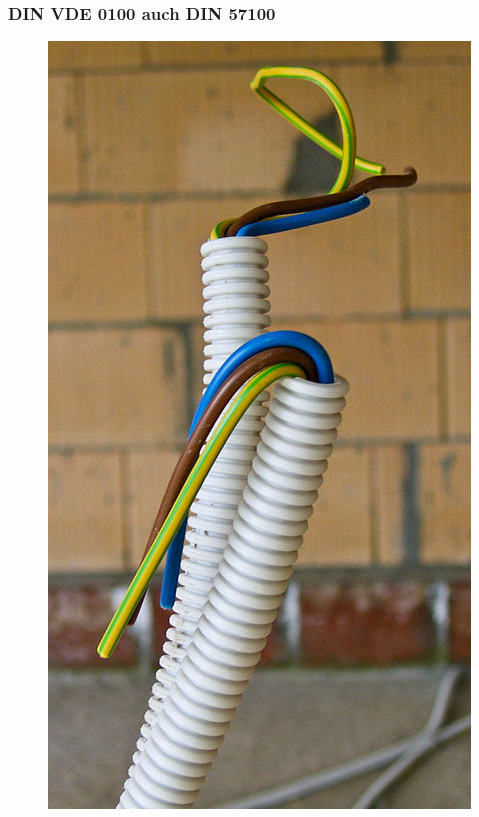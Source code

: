 \begin{frame}
  \frametitle{DIN VDE 0100 auch DIN 57100}
  \begin{center}
    \begin{figure}
      \includegraphics[width=\textwidth,height=0.75\textheight,keepaspectratio]{a19/ElectricWireGrounded.jpg}
    \end{figure}
  \end{center}
\end{frame}

